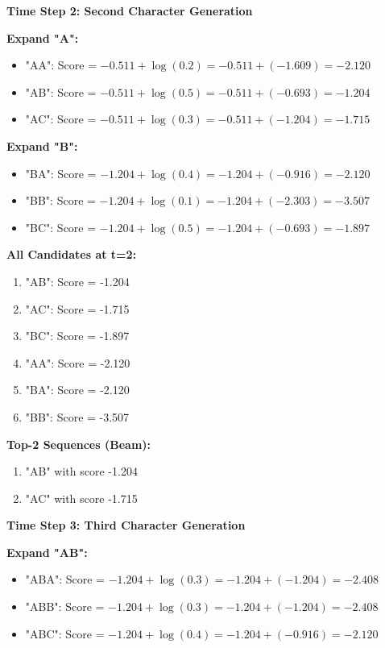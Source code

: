 \documentclass[12pt]{article}
\begin{document}
\begin{enumerate}[(a)]
{    \textbf{Time Step 2: Second Character Generation}
    
    \textbf{Expand "A":}
    \begin{itemize}
        \item "AA": Score = $-0.511 + \log(0.2) = -0.511 + (-1.609) = -2.120$
        \item "AB": Score = $-0.511 + \log(0.5) = -0.511 + (-0.693) = -1.204$
        \item "AC": Score = $-0.511 + \log(0.3) = -0.511 + (-1.204) = -1.715$
    \end{itemize}
    
    \textbf{Expand "B":}
    \begin{itemize}
        \item "BA": Score = $-1.204 + \log(0.4) = -1.204 + (-0.916) = -2.120$
        \item "BB": Score = $-1.204 + \log(0.1) = -1.204 + (-2.303) = -3.507$
        \item "BC": Score = $-1.204 + \log(0.5) = -1.204 + (-0.693) = -1.897$
    \end{itemize}
    
    \textbf{All Candidates at t=2:}
    \begin{enumerate}
        \item "AB": Score = -1.204
        \item "AC": Score = -1.715
        \item "BC": Score = -1.897
        \item "AA": Score = -2.120
        \item "BA": Score = -2.120
        \item "BB": Score = -3.507
    \end{enumerate}
    
    \textbf{Top-2 Sequences (Beam):}
    \begin{enumerate}
        \item "AB" with score -1.204
        \item "AC" with score -1.715
    \end{enumerate}
    
    \textbf{Time Step 3: Third Character Generation}
    
    \textbf{Expand "AB":}
    \begin{itemize}
        \item "ABA": Score = $-1.204 + \log(0.3) = -1.204 + (-1.204) = -2.408$
        \item "ABB": Score = $-1.204 + \log(0.3) = -1.204 + (-1.204) = -2.408$
        \item "ABC": Score = $-1.204 + \log(0.4) = -1.204 + (-0.916) = -2.120$
    \end{itemize}
    
}
\end{enumerate}
\end{document}
